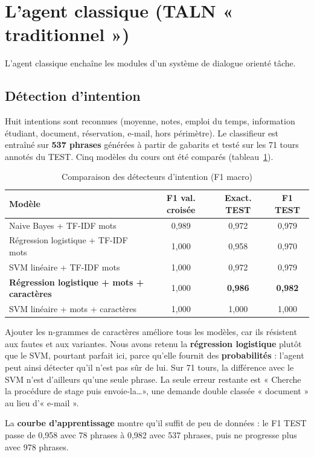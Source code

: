 \documentclass[11pt,a4paper]{report}
\begin{document}
\section{L'agent classique (TALN « traditionnel »)}
L'agent classique enchaîne les modules d'un système de dialogue orienté tâche.

\subsection{Détection d'intention}
Huit intentions sont reconnues (moyenne, notes, emploi du temps, information étudiant, document, réservation,
e-mail, hors périmètre). Le classifieur est entraîné sur \textbf{537 phrases} générées à partir de gabarits et
testé sur les 71 tours annotés du TEST. Cinq modèles du cours ont été comparés (tableau~\ref{tab:intent}).

\begin{table}[H]
\centering
\caption{Comparaison des détecteurs d'intention (F1 macro)}
\label{tab:intent}
\small
\begin{tabular}{@{}lccc@{}}
\toprule
\textbf{Modèle} & \textbf{F1 val. croisée} & \textbf{Exact. TEST} & \textbf{F1 TEST} \\
\midrule
Naive Bayes + TF-IDF mots                 & 0,989 & 0,972 & 0,979 \\
Régression logistique + TF-IDF mots       & 1,000 & 0,958 & 0,970 \\
SVM linéaire + TF-IDF mots                & 1,000 & 0,972 & 0,979 \\
\rowcolor{vertclair!40}\textbf{Régression logistique + mots + caractères} & 1,000 & \textbf{0,986} & \textbf{0,982} \\
SVM linéaire + mots + caractères          & 1,000 & 1,000 & 1,000 \\
\bottomrule
\end{tabular}
\end{table}

Ajouter les n-grammes de caractères améliore tous les modèles, car ils résistent aux fautes et aux variantes.
Nous avons retenu la \textbf{régression logistique} plutôt que le SVM, pourtant parfait ici, parce qu'elle fournit
des \textbf{probabilités} : l'agent peut ainsi détecter qu'il n'est pas sûr de lui. Sur 71 tours, la différence
avec le SVM n'est d'ailleurs qu'une seule phrase. La seule erreur restante est « Cherche la procédure de stage
puis envoie-la\dots », une demande double classée « document » au lieu d'« e-mail ».

La \textbf{courbe d'apprentissage} montre qu'il suffit de peu de données : le F1 TEST passe de 0,958 avec 78
phrases à 0,982 avec 537 phrases, puis ne progresse plus avec 978 phrases.
\end{document}
